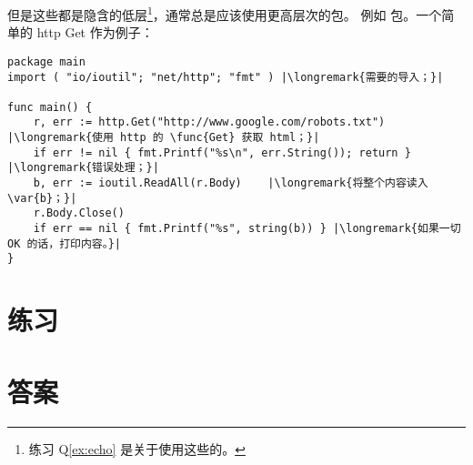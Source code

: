 但是这些都是隐含的低层\footnote{练习 Q\ref{ex:echo} 是关于使用这些的。}，通常总是应该使用更高层次的包。
例如  包。一个简单的 http Get 作为例子：
\begin{lstlisting}
package main
import ( "io/ioutil"; "net/http"; "fmt" ) |\longremark{需要的导入；}|

func main() {
    r, err := http.Get("http://www.google.com/robots.txt") |\longremark{使用 http 的 \func{Get} 获取 html；}|
    if err != nil { fmt.Printf("%s\n", err.String()); return } |\longremark{错误处理；}|
    b, err := ioutil.ReadAll(r.Body)    |\longremark{将整个内容读入 \var{b}；}|
    r.Body.Close()  
    if err == nil { fmt.Printf("%s", string(b)) } |\longremark{如果一切 OK 的话，打印内容。}|
}
\end{lstlisting}
\showremarks

\section{练习}














\cleardoublepage
\section{答案}
\shipoutAnswer
